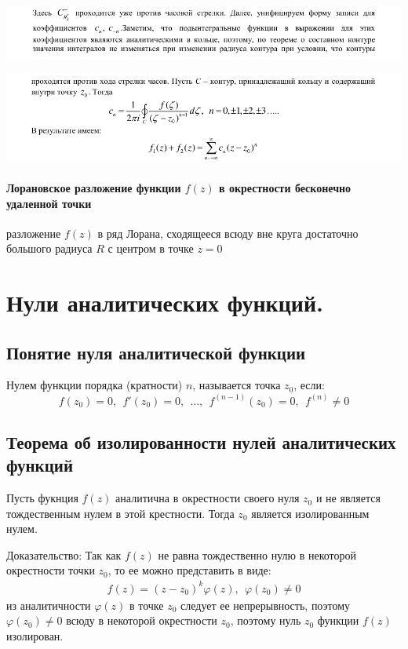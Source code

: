 \documentclass[12pt]{extarticle}
\begin{document}
\par\includegraphics[width=\textwidth]{proof_loran_3}
\par\includegraphics[width=\textwidth]{proof_loran_4}

\paragraph{Лорановское разложение функции $f(z)$ в окрестности бесконечно
удаленной точки}
разложение $f(z)$ в ряд Лорана, сходящееся всюду вне круга
достаточно большого радиуса $R$ с центром в точке $z=0$


\section{Нули аналитических функций.}
\subsection{Понятие нуля аналитической функции}
Нулем функции порядка (кратности) $n$, называется точка $z_{0}$, если:
\begin{displaymath}
    f(z_{0})=0,\ \ f'(z_{0})=0,\ \ \ldots,
    \ \ f^{(n-1)}(z_{0})=0,\ \ f^{(n)}\neq 0
\end{displaymath}
\subsection{Теорема об изолированности нулей аналитических функций}
Пусть фукнция $f(z)$ аналитична в окрестности своего нуля $z_{0}$ и не
является тождественным нулем в этой крестности. Тогда $z_{0}$ является
изолированным нулем.
\par Доказательство: Так как $f(z)$ не равна тождественно нулю в
некоторой окрестности точки $z_{0}$, то ее можно представить в виде:
\begin{eqnarray*}
    f(z)=(z-z_{0})^{k}\varphi(z),
    \ \ \varphi(z_{0})\neq 0
\end{eqnarray*}
из аналитичности $\varphi(z)$ в точке $z_{0}$ следует ее непрерывность,
поэтому $\varphi(z_{0})\neq 0$ всюду в некоторой окрестности $z_{0}$,
поэтому нуль $z_{0}$ функции $f(z)$ изолирован.
\end{document}
